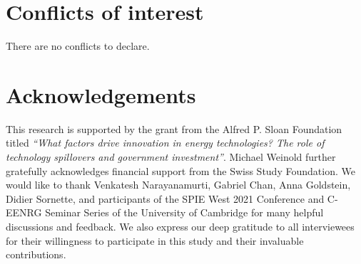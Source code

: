 \documentclass[twoside,twocolumn,9pt]{article}
\renewcommand{\refname}{Notes and references}
\begin{document}
\section*{Conflicts of interest}
There are no conflicts to declare.

\section*{Acknowledgements}
This research is supported by the grant from the Alfred P. Sloan Foundation titled \textit{“What factors drive innovation in energy technologies? The role of technology spillovers and government investment”}. Michael Weinold further gratefully acknowledges financial support from the Swiss Study Foundation. We would like to thank Venkatesh Narayanamurti, Gabriel Chan, Anna Goldstein, Didier Sornette, and participants of the SPIE West 2021 Conference and C-EENRG Seminar Series of the University of Cambridge for many helpful discussions and feedback. We also express our deep gratitude to all interviewees for their willingness to participate in this study and their invaluable contributions.



\balance



\end{document}
